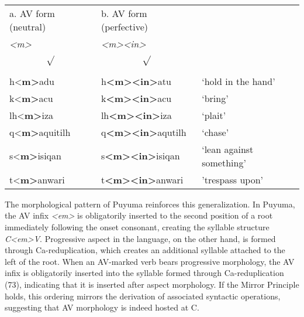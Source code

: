 \documentclass[10pt]{article}
\begin{document}
\begin{exe}
\begin{table}[h]
\hspace{+1cm}\begin{tabular}{lll} %
     a. AV form (neutral) & b. AV form (perfective) &  
     \\
    \hspace{+5mm}\textit{<m>\hspace{-1mm}\[
    \sqrt{\vphantom{^2}}
    \]} & \textit{<m><in>\hspace{-1mm}\[
    \sqrt{\vphantom{^2}}
    \]} & \\\midrule
   h<\textbf{m>}adu  & h\textbf{<m><in>}atu  & `hold in the hand'               \\
     k<\textbf{m>}acu  & k\textbf{<m><in>}acu  & `bring'  \\
     lh<\textbf{m>}iza  & lh\textbf{<m><in>}iza  & `plait'  \\
     q<\textbf{m>}aquitilh  & q\textbf{<m><in>}aqutilh  & `chase'  \\
      s<\textbf{m>}isiqan  & s\textbf{<m><in>}isiqan  & `lean against something'  \\
    t<\textbf{m>}anwari  & t\textbf{<m><in>}anwari  & 'trespass upon'  \\\bottomrule 
 
\end{tabular}
\end{table}
\end{exe}

The morphological pattern of Puyuma reinforces this generalization. In Puyuma, the AV infix \textit{<em>} is obligatorily inserted to the second position of a root immediately following the onset consonant, creating the syllable structure \textit{C<em>V}. Progressive aspect in the language, on the other hand, is formed through Ca-reduplication, which creates an additional syllable attached to the left of the root. When an AV-marked verb bears progressive morphology, the AV infix is obligatorily inserted into the syllable formed through Ca-reduplication (73), indicating that it is inserted after aspect morphology. If the Mirror Principle holds, this ordering mirrors the derivation of associated syntactic operations, suggesting that AV morphology is indeed hosted at C.
\end{document}
